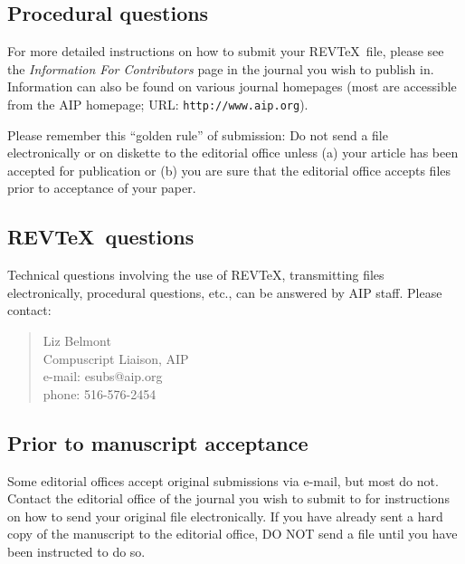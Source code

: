 \subsection{Procedural questions}
\label{home}
For more detailed instructions on how to submit your REV\TeX\ file,
please see the {\it Information For Contributors} page in the journal
you wish to publish in. Information can also be found on various
journal homepages (most are accessible from the AIP homepage; URL:
{\tt http://www.aip.org}).

Please remember this ``golden rule'' of submission: Do not send a file
electronically or on diskette to the editorial office unless (a) your
article has been accepted for publication or (b) you are sure that
the editorial office accepts files prior to acceptance of your paper.


\subsection{REV\TeX\ questions}

Technical questions involving the use of REV\TeX\/, transmitting files
electronically, procedural questions, etc., can be answered 
by AIP staff. Please contact:

\begin{verse}
Liz Belmont\\
Compuscript Liaison, AIP\\
e-mail: esubs@aip.org\\
phone: 516-576-2454
\end{verse}

\subsection{Prior to manuscript acceptance}

Some editorial offices accept original submissions via e-mail,
but most do not. Contact the editorial office of the journal you
wish to submit to for instructions on how to send your original
file electronically. If you have already sent a hard copy of the
manuscript to the editorial office, DO NOT send a file until you
have been instructed to do so.

